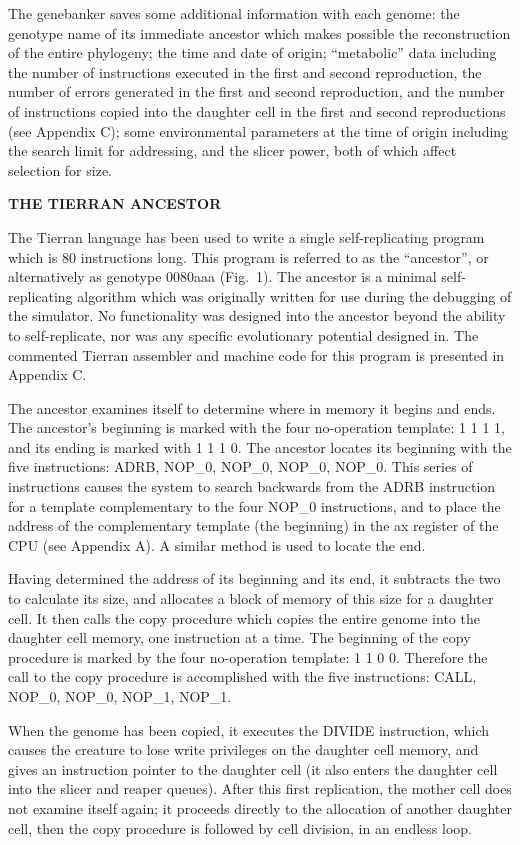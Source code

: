 The genebanker saves some additional information with each genome: the
genotype name of its immediate ancestor which makes possible the
reconstruction of the entire phylogeny; the time and date of origin;
``metabolic'' data including the number of instructions executed in the
first and second reproduction, the number of errors generated in the first
and second reproduction, and the number of instructions copied into the
daughter cell in the first and second reproductions (see Appendix C); some
environmental parameters at the time of origin including the search limit
for addressing, and the slicer power, both of which affect selection for size.

\LP
\bf THE TIERRAN ANCESTOR\rm
\eLP

The Tierran language has been used to write a single self-replicating program
which is 80 instructions long.  This program is referred to as the
``ancestor'', or alternatively as genotype 0080aaa (Fig.\ 1).  The ancestor
is a minimal self-replicating algorithm which was originally written for use
during the debugging of the simulator.  No functionality was designed into
the ancestor beyond the ability to self-replicate, nor was any specific
evolutionary potential designed in.  The commented Tierran assembler and
machine code for this program is presented in Appendix C.

The ancestor examines itself to determine where in memory it begins and ends.
The ancestor's beginning is marked with the four no-operation template:
1 1 1 1, and its ending is marked with 1 1 1 0.  The ancestor locates its
beginning with the five instructions: ADRB, NOP\_0, NOP\_0, NOP\_0, NOP\_0.
This series of instructions causes the system to search backwards
from the ADRB instruction for a template complementary to the four NOP\_0
instructions, and to place the address of the complementary template
(the beginning) in the ax register of the CPU (see Appendix A).  A similar
method is used to locate the end.

Having determined the address of its beginning and its end, it subtracts
the two to calculate its size, and allocates a block of memory of this size
for a daughter cell.  It then calls the copy procedure which copies the entire
genome into the daughter cell memory, one instruction at a time.
The beginning of the copy procedure is marked by the four no-operation
template: 1 1 0 0.  Therefore the call to the copy procedure is accomplished
with the five instructions: CALL, NOP\_0, NOP\_0, NOP\_1, NOP\_1.

When the genome has been copied, it executes the DIVIDE instruction, which
causes the creature to lose write privileges on the daughter cell memory,
and gives an instruction pointer to the daughter cell (it also enters the
daughter cell into the slicer and reaper queues).  After this first
replication, the mother cell does not examine itself again; it proceeds
directly to the allocation of another daughter cell, then the copy procedure
is followed by cell division, in an endless loop.

